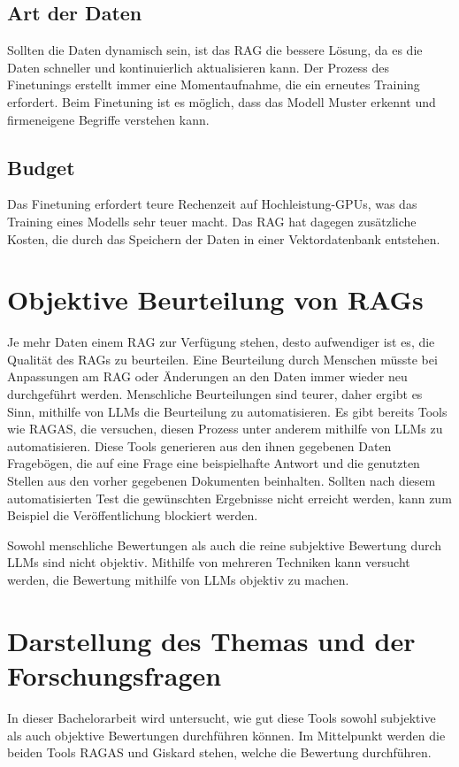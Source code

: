 \subsection{Art der Daten}
Sollten die Daten dynamisch sein, ist das RAG die bessere Lösung, da es die Daten schneller und kontinuierlich aktualisieren kann.
Der Prozess des Finetunings erstellt immer eine Momentaufnahme, die ein erneutes Training erfordert.
Beim Finetuning ist es möglich, dass das Modell Muster erkennt und firmeneigene Begriffe verstehen kann.

\subsection{Budget}
Das Finetuning erfordert teure Rechenzeit auf Hochleistung-GPUs, was das Training eines Modells sehr teuer macht.
Das RAG hat dagegen zusätzliche Kosten, die durch das Speichern der Daten in einer Vektordatenbank entstehen.


\section{Objektive Beurteilung von RAGs}
Je mehr Daten einem RAG zur Verfügung stehen, desto aufwendiger ist es, die Qualität des RAGs zu beurteilen.
Eine Beurteilung durch Menschen müsste bei Anpassungen am RAG oder Änderungen an den Daten immer wieder neu durchgeführt werden.
Menschliche Beurteilungen sind teurer, daher ergibt es Sinn, mithilfe von LLMs die Beurteilung zu automatisieren.
Es gibt bereits Tools wie RAGAS, die versuchen, diesen Prozess unter anderem mithilfe von LLMs zu automatisieren.
Diese Tools generieren aus den ihnen gegebenen Daten Fragebögen, die auf eine Frage eine beispielhafte Antwort und die genutzten Stellen aus den vorher gegebenen Dokumenten beinhalten.
Sollten nach diesem automatisierten Test die gewünschten Ergebnisse nicht erreicht werden, kann zum Beispiel die Veröffentlichung blockiert werden.

Sowohl menschliche Bewertungen als auch die reine subjektive Bewertung durch LLMs sind nicht objektiv.
Mithilfe von mehreren Techniken kann versucht werden, die Bewertung mithilfe von LLMs objektiv zu machen.

\section{Darstellung des Themas und der Forschungsfragen}
In dieser Bachelorarbeit wird untersucht, wie gut diese Tools sowohl subjektive als auch objektive Bewertungen durchführen können.
Im Mittelpunkt werden die beiden Tools RAGAS und Giskard stehen, welche die Bewertung durchführen.




